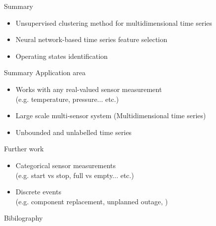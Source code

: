 \documentclass{beamer}
\begin{document}
\begin{frame}{Summary}
  \begin{itemize}
    \item Unsupervised clustering method for multidimensional time series
    \item Neural network-based time series feature selection
    \item Operating states identification
  \end{itemize}
\end{frame}

\begin{frame}{Summary}
  Application area
    \begin{itemize}
      \item Works with any real-valued sensor measurement 
        \\ (e.g. temperature, pressure... etc.)
      \item Large scale multi-sensor system (Multidimensional time series)
      \item Unbounded and unlabelled time series
    \end{itemize}
  Further work
    \begin{itemize}
      \item Categorical sensor measurements 
        \\(e.g. start vs stop, full vs empty... etc.)
      \item Discrete events 
        \\(e.g. component replacement, unplanned outage, )
    \end{itemize}
\end{frame}

\begin{frame}[allowframebreaks]{Bibilography}
  
  
\end{frame}
\end{document}

